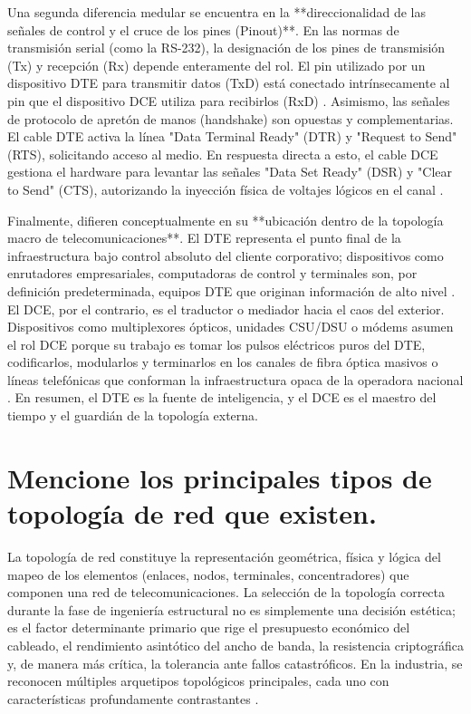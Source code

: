 \documentclass[a4paper,12pt]{article}
\begin{document}
Una segunda diferencia medular se encuentra en la **direccionalidad de las señales de control y el cruce de los pines (Pinout)**. En las normas de transmisión serial (como la RS-232), la designación de los pines de transmisión (Tx) y recepción (Rx) depende enteramente del rol. El pin utilizado por un dispositivo DTE para transmitir datos (TxD) está conectado intrínsecamente al pin que el dispositivo DCE utiliza para recibirlos (RxD) \cite{dte_dce_difference}. Asimismo, las señales de protocolo de apretón de manos (handshake) son opuestas y complementarias. El cable DTE activa la línea "Data Terminal Ready" (DTR) y "Request to Send" (RTS), solicitando acceso al medio. En respuesta directa a esto, el cable DCE gestiona el hardware para levantar las señales "Data Set Ready" (DSR) y "Clear to Send" (CTS), autorizando la inyección física de voltajes lógicos en el canal \cite{dte_dce_cables}.

Finalmente, difieren conceptualmente en su **ubicación dentro de la topología macro de telecomunicaciones**. El DTE representa el punto final de la infraestructura bajo control absoluto del cliente corporativo; dispositivos como enrutadores empresariales, computadoras de control y terminales son, por definición predeterminada, equipos DTE que originan información de alto nivel \cite{dte_dce_cables, dte_dce_difference}. El DCE, por el contrario, es el traductor o mediador hacia el caos del exterior. Dispositivos como multiplexores ópticos, unidades CSU/DSU o módems asumen el rol DCE porque su trabajo es tomar los pulsos eléctricos puros del DTE, codificarlos, modularlos y terminarlos en los canales de fibra óptica masivos o líneas telefónicas que conforman la infraestructura opaca de la operadora nacional \cite{dte_dce_difference}. En resumen, el DTE es la fuente de inteligencia, y el DCE es el maestro del tiempo y el guardián de la topología externa.

\section{Mencione los principales tipos de topología de red que existen.}

La topología de red constituye la representación geométrica, física y lógica del mapeo de los elementos (enlaces, nodos, terminales, concentradores) que componen una red de telecomunicaciones. La selección de la topología correcta durante la fase de ingeniería estructural no es simplemente una decisión estética; es el factor determinante primario que rige el presupuesto económico del cableado, el rendimiento asintótico del ancho de banda, la resistencia criptográfica y, de manera más crítica, la tolerancia ante fallos catastróficos. En la industria, se reconocen múltiples arquetipos topológicos principales, cada uno con características profundamente contrastantes \cite{topology_geeks, topology_international}.
\end{document}
